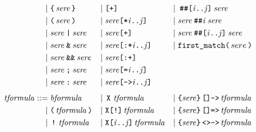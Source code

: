 \documentclass[a4paper,twoside,10pt,DIV=12]{scrreprt}
\DeclareMathOperator{\X}{\texttt{X}}
\newcommand{\StrongX}{\texttt{X[!]}}
\newcommand{\XREP}[1]{\texttt{X[#1]}}
\DeclareMathOperator{\NOT}{\texttt{!}}
\newcommand{\OR}{\mathbin{\texttt{|}}}
\newcommand{\AND}{\mathbin{\texttt{\&}}}
\newcommand{\ANDALT}{\mathbin{\texttt{\&\&}}}
\newcommand{\FUSION}{\mathbin{\texttt{:}}}
\newcommand{\CONCAT}{\mathbin{\texttt{;}}}
\newcommand{\DELAY}[1]{\mathbin{\texttt{\#\##1}}}
\newcommand{\DELAYR}[1]{\mathbin{\texttt{\#\#[#1]}}}
\newcommand{\0}{\texttt{0}}
\newcommand{\1}{\texttt{1}}
\newcommand{\STAR}[1]{\texttt{[*#1]}}
\newcommand{\FSTAR}[1]{\texttt{[:*#1]}}
\newcommand{\EQUAL}[1]{\texttt{[=#1]}}
\newcommand{\GOTO}[1]{\texttt{[->#1]}}
\newcommand{\PLUS}{\texttt{[+]}}
\newcommand{\FPLUS}{\texttt{[:+]}}
\newcommand{\FIRSTMATCH}{\texttt{first\_match}}
\newcommand{\Esuffix}{\texttt{<>->}}
\newcommand{\Asuffix}{\texttt{[]->}}
\newcommand{\AsuffixEQ}{\texttt{[]=>}}
\newcommand\mvar[1]{\ensuremath{\mathit{#1}}}
\newcommand\code[1]{\texttt{#1}}
\newcommand\tsamp[1]{\text{\texttt{#1}}}
\newcommand\msamp[1]{#1}
\begin{document}
\begin{align*}
  \mid{}                    & \tsamp{\{}\,\mathit{sere}\,\tsamp{\}}                  & \mid{} & \msamp{\PLUS{}}                                            & \mid{} & \DELAYR{\mvar{i}..\mvar{j}}\mathit{sere}                                 \\
  \mid{}                    & \tsamp{(}\,\mathit{sere}\,\tsamp{)}                    & \mid{} & \mathit{sere}\msamp{\STAR{\mvar{i}..\mvar{j}}}             & \mid{} & \mathit{sere}\DELAY{\mvar{i}}\mathit{sere}                               \\
  \mid{}                    & \mathit{sere}\msamp{\OR}\mathit{sere}                  & \mid{} & \mathit{sere}\msamp{\PLUS}                                 & \mid{} & \mathit{sere}\DELAYR{\mvar{i}..\mvar{j}}\mathit{sere}                    \\
  \mid{}                    & \mathit{sere}\msamp{\AND}\mathit{sere}                 & \mid{} & \mathit{sere}\msamp{\FSTAR{\mvar{i}..\mvar{j}}}            & \mid{} & \FIRSTMATCH\code(\,sere\,\code)                                          \\
  \mid{}                    & \mathit{sere}\msamp{\ANDALT}\mathit{sere}              & \mid{} & \mathit{sere}\msamp{\FPLUS}                                                                                                                    \\
  \mid{}                    & \mathit{sere}\msamp{\CONCAT}\mathit{sere}              & \mid{} & \mathit{sere}\msamp{\EQUAL{\mvar{i}..\mvar{j}}}                                                                                                \\
  \mid{}                    & \mathit{sere}\msamp{\FUSION}\mathit{sere}              & \mid{} & \mathit{sere}\msamp{\GOTO{\mvar{i}..\mvar{j}}}                                                                                                 \\[1ex]
 \mathit{tformula} ::={}    & \mathit{bformula}                                      & \mid{} & \msamp{\X}\,\mathit{tformula}                              & \mid{} & \tsamp{\{}\mathit{sere}\tsamp{\}}\,\msamp{\Asuffix}\,\mathit{tformula}   \\
 \mid{}                     & \tsamp{(}\,\mathit{tformula}\,\tsamp{)}                & \mid{} & \msamp{\StrongX}\,\mathit{tformula}                        & \mid{} & \tsamp{\{}\mathit{sere}\tsamp{\}}\,\msamp{\AsuffixEQ}\,\mathit{tformula} \\
 \mid{}                     & \msamp{\NOT}\,\mathit{tformula}\,                      & \mid{} & \msamp{\XREP{\mvar{i}..\mvar{j}}}\,\mathit{tformula}       & \mid{} & \tsamp{\{}\mathit{sere}\tsamp{\}}\,\msamp{\Esuffix}\,\mathit{tformula}   \\

\end{align*}
\end{document}
